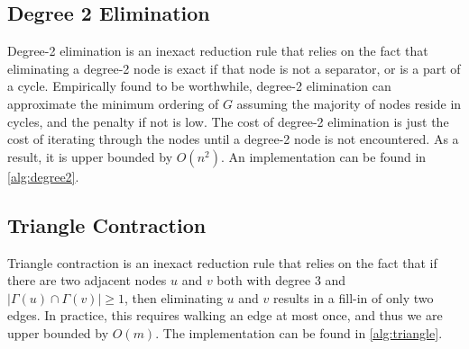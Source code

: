 \documentclass[final]{siamart250211}
\begin{document}
\subsection{Degree 2 Elimination}

Degree-2 elimination is an inexact reduction rule that relies on the fact that eliminating a degree-2 node is exact if that node is not a separator, or is a part of a cycle. Empirically found to be worthwhile, degree-2 elimination can approximate the minimum ordering of $G$ assuming the majority of nodes reside in cycles, and the penalty if not is low. The cost of degree-2 elimination is just the cost of iterating through the nodes until a degree-2 node is not encountered. As a result, it is upper bounded by $O(n^2)$. An implementation can be found in \cref{alg:degree2}.

\begin{algorithm}
\caption{Degree-2 Elimination}
\label{alg:degree2}
\begin{algorithmic}
    \ENDIF
\ENDFOR
\end{algorithmic}
\end{algorithm}

\subsection{Triangle Contraction}
Triangle contraction is an inexact reduction rule that relies on the fact that if there are two adjacent nodes $u$ and $v$ both with degree 3 and $|\Gamma(u)\cap\Gamma(v)| \ge 1$, then eliminating $u$ and $v$ results in a fill-in of only two edges. In practice, this requires walking an edge at most once, and thus we are upper bounded by $O(m)$. The implementation can be found in \cref{alg:triangle}.

\begin{algorithm}
\caption{Triangle Contraction}
\label{alg:triangle}
\begin{algorithmic}
                    \ENDIF
                \ENDFOR
            \ENDIF
        \ENDWHILE
        \ENDIF
    \ENDIF
\ENDFOR
\end{algorithmic}
\end{algorithm}
\end{document}
